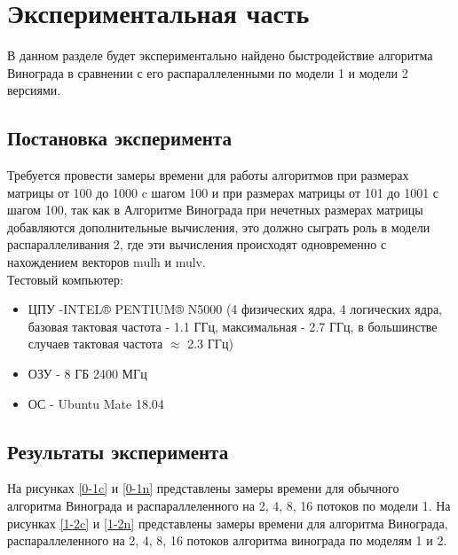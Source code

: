 \documentclass[a4paper, 14pt]{article}
\begin{document}
    
       	\newpage
       	
        \section{Экспериментальная часть}
		В данном разделе будет экспериментально найдено быстродействие алгоритма Винограда в сравнении с его распараллеленными по модели 1 и модели 2 версиями.
		\subsection{Постановка эксперимента}
		\parindent=1cm
		Требуется провести замеры времени для работы алгоритмов при размерах матрицы от 100 до 1000 c шагом 100 и при размерах матрицы от 101 до 1001 с шагом 100, так как в Алгоритме Винограда при нечетных размерах матрицы добавляются дополнительные вычисления, это должно сыграть роль в модели распараллеливания 2, где эти вычисления происходят одновременно с нахождением векторов mulh и mulv.\\
		
		
		Тестовый компьютер:
		\begin{itemize}
			\item ЦПУ -INTEL® PENTIUM® N5000 (4 физических ядра, 4 логических ядра, базовая тактовая частота - 1.1 ГГц, максимальная - 2.7 ГГц, в большинстве случаев тактовая частота $\approx$ 2.3 ГГц)\cite{intel}
			\item ОЗУ - 8 ГБ 2400 МГц
			\item ОС - Ubuntu Mate 18.04
		\end{itemize}
		\subsection{Результаты эксперимента}
		На рисунках \ref{0-1c} и \ref{0-1n} представлены замеры времени для обычного алгоритма Винограда и распараллеленного на 2, 4, 8, 16 потоков по модели 1. На рисунках \ref{1-2c} и \ref{1-2n} представлены замеры времени для алгоритма Винограда, распараллеленного на 2, 4, 8, 16 потоков алгоритма винограда по моделям 1 и 2.
		 
\end{document}
